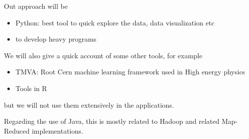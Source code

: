 Out approach will be
\begin{itemize}
   \item Python: best tool to quick explore the data, data visualization etc
   \item \cpp{} to develop heavy programs
\end{itemize}

We will also give a quick account of some other tools, for example
\begin{itemize}
   \item TMVA: Root Cern machine learning framework used in High energy physics
   \item Tools in R
\end{itemize}
but we will not use them extensively in the applications.

Regarding the use of Java, this is mostly related to Hadoop and related
Map-Reduced implementations. 




